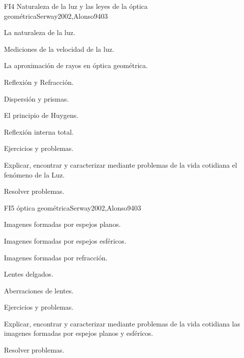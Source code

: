 \begin{syllabus}
\begin{unit}{FI4 Naturaleza de la luz y las leyes de la óptica geométrica}{}{Serway2002,Alonso94}{0}{3}
\begin{topics}
      \item La naturaleza de la luz.
        \item Mediciones de la velocidad de la luz.
        \item La aproximación de rayos en óptica geométrica.
        \item Reflexión y Refracción.
        \item Dispersión y prismas.
        \item El principio de Huygens.
        \item Reflexión interna total.
        \item Ejercicios y problemas.
   \end{topics}

   \begin{learningoutcomes}
      \item Explicar, encontrar y caracterizar mediante problemas de la vida cotidiana el fenómeno de la Luz.
      \item Resolver problemas.
      \end{learningoutcomes}
\end{unit}

\begin{unit}{FI5 óptica geométrica}{}{Serway2002,Alonso94}{0}{3}
\begin{topics}
      \item Imagenes formadas por espejos planos.
        \item Imagenes formadas por espejos esféricos.
        \item Imagenes formadas por refracción.
        \item Lentes delgados.
        \item Aberraciones de lentes.
        \item Ejercicios y problemas.
      \end{topics}

   \begin{learningoutcomes}
      \item Explicar, encontrar y caracterizar mediante problemas de la vida cotidiana las imagenes formadas por espejos planos y esféricos.
      \item Resolver problemas.
   \end{learningoutcomes}
\end{unit}


\end{syllabus}
